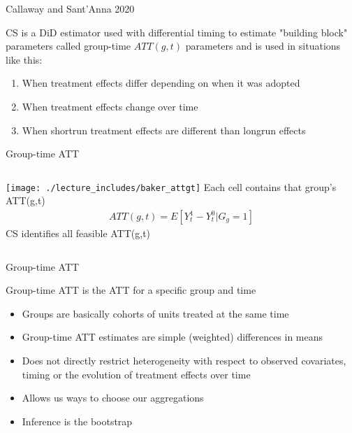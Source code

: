 \documentclass{beamer}
\begin{document}
\begin{frame}{Callaway and Sant'Anna 2020}

CS is a DiD estimator used with differential timing to estimate "building block" parameters called group-time $ATT(g,t)$ parameters and is used in situations like this:

\begin{enumerate}
\item When treatment effects differ depending on when it was adopted
\item When treatment effects change over time
\item When shortrun treatment effects are different than longrun effects
\end{enumerate}


\end{frame}




\begin{frame}{Group-time ATT}
       \begin{columns}
             \centering
             \texttt{[image: ./lecture\_includes/baker\_attgt]}
            Each cell contains that group's ATT(g,t)
\begin{eqnarray*}
ATT(g,t) = E[Y_t^1 - Y_t^0 | G_g=1]
\end{eqnarray*}CS identifies all feasible ATT(g,t)
         \end{columns} 
    \end{frame}




\begin{frame}{Group-time ATT}

Group-time ATT is the ATT for a specific group and time
\begin{itemize}
\item Groups are basically cohorts of units treated at the same time
\item Group-time ATT estimates are simple (weighted) differences in means
\item Does not directly restrict heterogeneity with respect to observed covariates, timing or the evolution of treatment effects over time
\item Allows us ways to choose our aggregations
\item Inference is the bootstrap
\end{itemize}

\end{frame}
\end{document}
